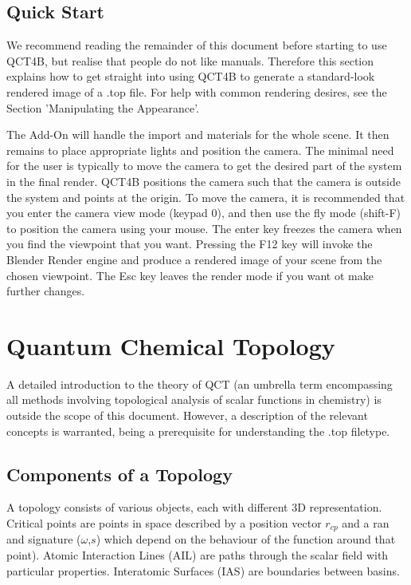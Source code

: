 \documentclass{report}
\begin{document}
\section{Quick Start}

We recommend reading the remainder of this document before starting to use QCT4B, but realise that people do not like manuals.
Therefore this section explains how to get straight into using QCT4B to generate a standard-look rendered image of a .top file.
For help with common rendering desires, see the Section 'Manipulating the Appearance'.

The Add-On will handle the import and materials for the whole scene.
It then remains to place appropriate lights and position the camera.
The minimal need for the user is typically to move the camera to get the desired part of the system in the final render.
QCT4B positions the camera such that the camera is outside the system and points at the origin.
To move the camera, it is recommended that you enter the camera view mode (keypad 0), and then use the fly mode (shift-F) to position the camera using your mouse.
The enter key freezes the camera when you find the viewpoint that you want.
Pressing the F12 key will invoke the Blender Render engine and produce a rendered image of your scene from the chosen viewpoint.
The Esc key leaves the render mode if you want ot make further changes.

\chapter{Quantum Chemical Topology}

A detailed introduction to the theory of QCT (an umbrella term encompassing all methods involving topological analysis of scalar functions in chemistry) is outside the scope of this document.
However, a description of the relevant concepts is warranted, being a prerequisite for understanding the .top filetype.

\section{Components of a Topology}

A topology consists of various objects, each with different 3D representation. 
Critical points are points in space described by a position vector $r_{cp}$ and a ran and signature ($\omega$,$s$) which depend on the behaviour of the function around that point).
Atomic Interaction Lines (AIL) are paths through the scalar field with particular properties.
Interatomic Surfaces (IAS) are boundaries between basins.
\end{document}
